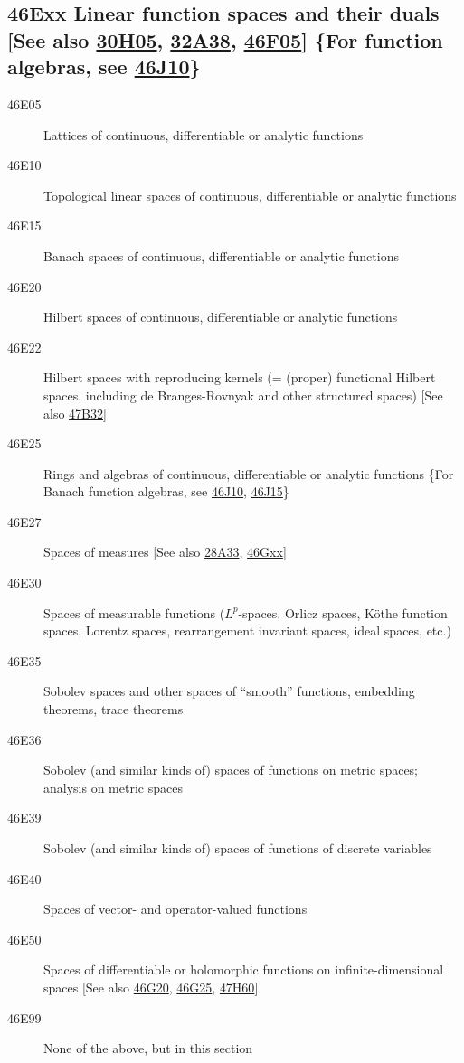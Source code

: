 \documentclass[letterpaper]{article}
\begin{document}
\subsection*{46Exx  Linear function spaces and their duals [See also \hyperref[30H05]{30H05}, \hyperref[32A38]{32A38}, \hyperref[46F05]{46F05}] \{For function algebras, see \hyperref[46J10]{46J10}\} }\label{46Exx}
\begin{description}  
\item [46E05]\label{46E05} Lattices of continuous, differentiable or analytic functions
\item [46E10]\label{46E10} Topological linear spaces of continuous, differentiable or analytic functions
\item [46E15]\label{46E15} Banach spaces of continuous, differentiable or analytic functions
\item [46E20]\label{46E20} Hilbert spaces of continuous, differentiable or analytic functions
\item [46E22]\label{46E22} Hilbert spaces with reproducing kernels (= (proper) functional Hilbert spaces, including de Branges-Rovnyak and other structured spaces) [See also \hyperref[47B32]{47B32}]
\item [46E25]\label{46E25} Rings and algebras of continuous, differentiable or analytic functions \{For Banach function algebras, see \hyperref[46J10]{46J10}, \hyperref[46J15]{46J15}\}
\item [46E27]\label{46E27} Spaces of measures [See also \hyperref[28A33]{28A33}, \hyperref[46Gxx]{46Gxx}]
\item [46E30]\label{46E30} Spaces of measurable functions ($L^p$-spaces, Orlicz spaces, K\"{o}the function spaces, Lorentz spaces, rearrangement invariant spaces, ideal spaces, etc.)
\item [46E35]\label{46E35} Sobolev spaces and other spaces of ``smooth'' functions, embedding theorems, trace theorems
\item [46E36]\label{46E36} Sobolev (and similar kinds of) spaces of functions on metric spaces; analysis on metric spaces
\item [46E39]\label{46E39} Sobolev (and similar kinds of) spaces of functions of discrete variables
\item [46E40]\label{46E40} Spaces of vector- and operator-valued functions
\item [46E50]\label{46E50} Spaces of differentiable or holomorphic functions on infinite-dimensional spaces [See also \hyperref[46G20]{46G20}, \hyperref[46G25]{46G25}, \hyperref[47H60]{47H60}]
\item [46E99]\label{46E99} None of the above, but in this section
\end{description}
\end{document}
